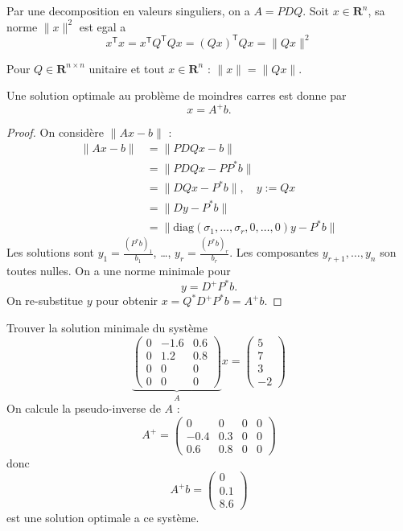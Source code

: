 Par une decomposition en valeurs singuliers, on a $A=PDQ$. Soit $x \in \mathbf{R}^{n}$, sa norme $\lVert x \rVert^{2}$ est egal a 
$$
x^{\mathsf{T}}x=x^{\mathsf{T}}Q^{\mathsf{T}}Qx=(Qx)^{\mathsf{T}}Qx=\lVert Qx \rVert^{2} 
$$
\begin{remark}
Pour $Q\in \mathbf{R}^{n\times n}$ unitaire et tout $x \in \mathbf{R}^{n}$ : $\lVert x \rVert=\lVert Qx \rVert$.
\end{remark}
\begin{theorem}
Une solution optimale au problème de moindres carres est donne par
$$
x=A^{+}b.
$$
\end{theorem}
\begin{proof}
On considère $\lVert Ax-b \rVert$ :
\begin{align*}
\lVert Ax-b \rVert  & =\lVert PDQx-b \rVert  \\
 & =\lVert PDQx-PP^{*}b \rVert  \\
 & =\lVert DQx-P^{*}b \rVert, \quad y:= Qx \\
 & =\lVert Dy-P^{*}b \rVert \\
 & =\lVert \mathrm{diag}(\sigma_{1},\dots,\sigma _{r},0,\dots,0)y-P^{*}b \rVert 
\end{align*}
Les solutions sont $y_{1}=\frac{(P^{*}b)_{1}}{b_{1}}$, \dots, $y_{r}=\frac{(P^{*}b)_{r}}{b_{r}}$. Les composantes $y_{r+1},\dots,y_{n}$ son toutes nulles. On a une norme minimale pour
$$
y=D^{+}P^{*}b.
$$
On re-substitue $y$ pour obtenir $x=Q^{*}D^{+}P^{*}b=A^{+}b$.
\end{proof}
\begin{example}
Trouver la solution minimale du système 
$$
\underbrace{ \begin{pmatrix}
0 & -1.6 & 0.6 \\
0 & 1.2 & 0.8 \\
0 & 0 & 0 \\
0 & 0 & 0 
\end{pmatrix} }_{ A }x=\begin{pmatrix}
5 \\
7 \\
3 \\
-2
\end{pmatrix}
$$
On calcule la pseudo-inverse de $A$ :
$$
A^{+}=\begin{pmatrix}
0 & 0 & 0 & 0 \\
-0.4 & 0.3 & 0 & 0 \\
0.6 & 0.8 & 0 & 0
\end{pmatrix}
$$
donc
$$
A^{+}b=\begin{pmatrix}
0 \\
0.1 \\
8.6
\end{pmatrix}
$$
est une solution optimale a ce système.
\end{example}

